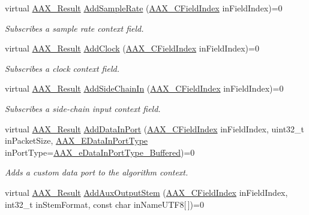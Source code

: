 \begin{DoxyCompactItemize}
virtual \mbox{\hyperlink{a00392_a4d8f69a697df7f70c3a8e9b8ee130d2f}{A\+A\+X\+\_\+\+Result}} \mbox{\hyperlink{a01781_adbd57beaa0a3143d3cf44b93ecdb59ec}{Add\+Sample\+Rate}} (\mbox{\hyperlink{a00392_ae807f8986143820cfb5d6da32165c9c7}{A\+A\+X\+\_\+\+C\+Field\+Index}} in\+Field\+Index)=0
\begin{DoxyCompactList}\small\item\em Subscribes a sample rate context field. \end{DoxyCompactList}\item 
virtual \mbox{\hyperlink{a00392_a4d8f69a697df7f70c3a8e9b8ee130d2f}{A\+A\+X\+\_\+\+Result}} \mbox{\hyperlink{a01781_a59727dee1043fcd7f14da130ab254445}{Add\+Clock}} (\mbox{\hyperlink{a00392_ae807f8986143820cfb5d6da32165c9c7}{A\+A\+X\+\_\+\+C\+Field\+Index}} in\+Field\+Index)=0
\begin{DoxyCompactList}\small\item\em Subscribes a clock context field. \end{DoxyCompactList}\item 
virtual \mbox{\hyperlink{a00392_a4d8f69a697df7f70c3a8e9b8ee130d2f}{A\+A\+X\+\_\+\+Result}} \mbox{\hyperlink{a01781_a1e0c9508d1eb0c9a60a87a0fb69f1dbe}{Add\+Side\+Chain\+In}} (\mbox{\hyperlink{a00392_ae807f8986143820cfb5d6da32165c9c7}{A\+A\+X\+\_\+\+C\+Field\+Index}} in\+Field\+Index)=0
\begin{DoxyCompactList}\small\item\em Subscribes a side-\/chain input context field. \end{DoxyCompactList}\item 
virtual \mbox{\hyperlink{a00392_a4d8f69a697df7f70c3a8e9b8ee130d2f}{A\+A\+X\+\_\+\+Result}} \mbox{\hyperlink{a01781_a230293b9f6bb413626cd487ca501df75}{Add\+Data\+In\+Port}} (\mbox{\hyperlink{a00392_ae807f8986143820cfb5d6da32165c9c7}{A\+A\+X\+\_\+\+C\+Field\+Index}} in\+Field\+Index, uint32\+\_\+t in\+Packet\+Size, \mbox{\hyperlink{a00491_ab5677b173ad8647c24d34d28272d11fc}{A\+A\+X\+\_\+\+E\+Data\+In\+Port\+Type}} in\+Port\+Type=\mbox{\hyperlink{a00491_ab5677b173ad8647c24d34d28272d11fcaa9f089bb87161125a38706c81ec522e0}{A\+A\+X\+\_\+e\+Data\+In\+Port\+Type\+\_\+\+Buffered}})=0
\begin{DoxyCompactList}\small\item\em Adds a custom data port to the algorithm context. \end{DoxyCompactList}\item 
virtual \mbox{\hyperlink{a00392_a4d8f69a697df7f70c3a8e9b8ee130d2f}{A\+A\+X\+\_\+\+Result}} \mbox{\hyperlink{a01781_a76266e8a07ce20cdbe5721172c32a93d}{Add\+Aux\+Output\+Stem}} (\mbox{\hyperlink{a00392_ae807f8986143820cfb5d6da32165c9c7}{A\+A\+X\+\_\+\+C\+Field\+Index}} in\+Field\+Index, int32\+\_\+t in\+Stem\+Format, const char in\+Name\+U\+T\+F8\mbox{[}$\,$\mbox{]})=0

\end{DoxyCompactItemize}
